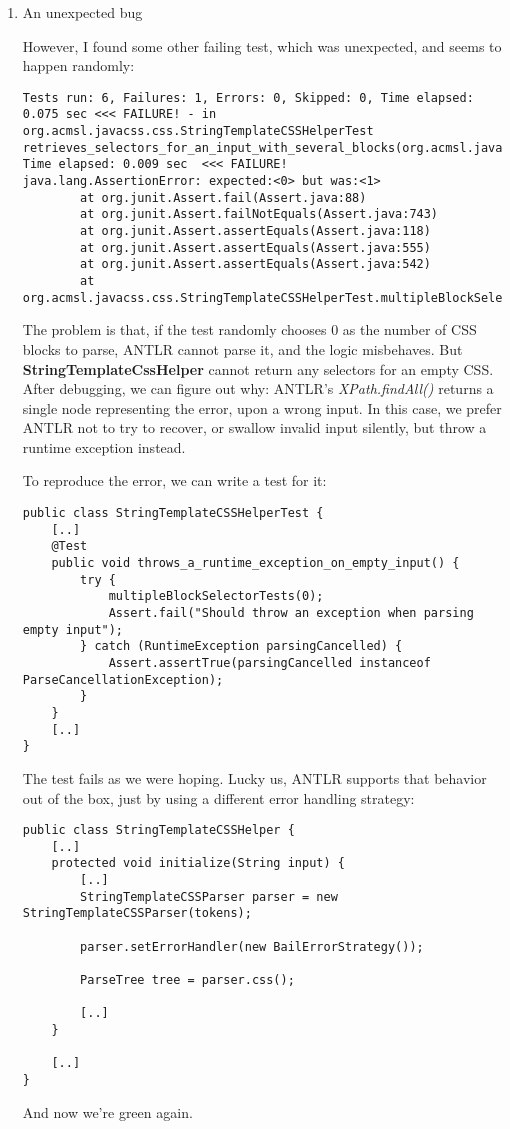 \documentclass[11pt]{article}
\begin{document}
\begin{enumerate}
\item An unexpected bug
\label{sec-1-4-5-1}

However, I found some other failing test, which was unexpected, and seems to happen randomly:

\begin{verbatim}
Tests run: 6, Failures: 1, Errors: 0, Skipped: 0, Time elapsed: 0.075 sec <<< FAILURE! - in org.acmsl.javacss.css.StringTemplateCSSHelperTest
retrieves_selectors_for_an_input_with_several_blocks(org.acmsl.javacss.css.StringTemplateCSSHelperTest)  Time elapsed: 0.009 sec  <<< FAILURE!
java.lang.AssertionError: expected:<0> but was:<1>
        at org.junit.Assert.fail(Assert.java:88)
        at org.junit.Assert.failNotEquals(Assert.java:743)
        at org.junit.Assert.assertEquals(Assert.java:118)
        at org.junit.Assert.assertEquals(Assert.java:555)
        at org.junit.Assert.assertEquals(Assert.java:542)
        at org.acmsl.javacss.css.StringTemplateCSSHelperTest.multipleBlockSelectorTests(StringTemplateCSSHelperTest.java:103)
\end{verbatim}

The problem is that, if the test randomly chooses 0 as the number of CSS blocks to parse, ANTLR cannot parse it, and
the logic misbehaves. But \textbf{StringTemplateCssHelper} cannot return any selectors for an empty CSS.
After debugging, we can figure out why: ANTLR's \emph{XPath.findAll()} returns a single node representing the error,
upon a wrong input. In this case, we prefer ANTLR not to try to recover, or swallow invalid input silently, but throw
a runtime exception instead.

To reproduce the error, we can write a test for it:

\begin{verbatim}
public class StringTemplateCSSHelperTest {
    [..]
    @Test
    public void throws_a_runtime_exception_on_empty_input() {
        try {
            multipleBlockSelectorTests(0);
            Assert.fail("Should throw an exception when parsing empty input");
        } catch (RuntimeException parsingCancelled) {
            Assert.assertTrue(parsingCancelled instanceof ParseCancellationException);
        }
    }
    [..]
}
\end{verbatim}

The test fails as we were hoping. Lucky us, ANTLR supports that behavior out of the box, just by
using a different error handling strategy:

\begin{verbatim}
public class StringTemplateCSSHelper {
    [..]
    protected void initialize(String input) {
        [..]
        StringTemplateCSSParser parser = new StringTemplateCSSParser(tokens);

        parser.setErrorHandler(new BailErrorStrategy());

        ParseTree tree = parser.css();

        [..]
    }

    [..]
}
\end{verbatim}

And now we're green again.
\end{enumerate}
\end{document}
